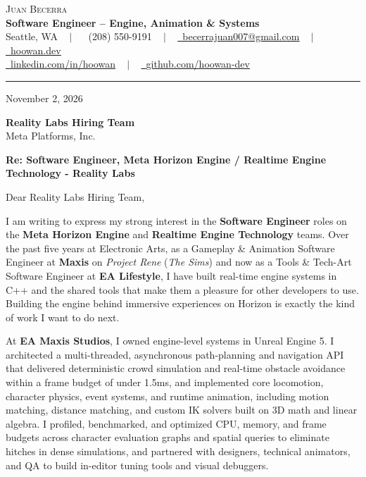 \documentclass[letterpaper,11pt]{article}
\begin{document}
\begin{center}
    {\Huge \scshape Juan Becerra} \\ \vspace{4pt}
    \textbf{\large Software Engineer -- Engine, Animation \& Systems} \\ \vspace{4pt}
    \small Seattle, WA ~ $|$ ~
    \raisebox{-0.1\height}\faPhone\ (208) 550-9191 ~ $|$ ~
    \href{mailto:becerrajuan007@gmail.com}{\raisebox{-0.2\height}\faEnvelope\ \underline{becerrajuan007@gmail.com}} ~ $|$ ~
    \href{https://hoowan.dev}{\raisebox{-0.2\height}\faGlobe\ \underline{hoowan.dev}} \\ \vspace{2pt}
    \href{https://linkedin.com/in/hoowan/}{\raisebox{-0.2\height}\faLinkedin\ \underline{linkedin.com/in/hoowan}} ~ $|$ ~
    \href{https://github.com/hoowan-dev}{\raisebox{-0.2\height}\faGithub\ \underline{github.com/hoowan-dev}}
\end{center}

\vspace{4pt}
\hrule
\vspace{14pt}

\noindent November 2, 2026

\vspace{8pt}
\noindent \textbf{Reality Labs Hiring Team} \\
Meta Platforms, Inc.

\vspace{8pt}
\noindent \textbf{Re: Software Engineer, Meta Horizon Engine / Realtime Engine Technology - Reality Labs}

\vspace{8pt}
\noindent Dear Reality Labs Hiring Team,

I am writing to express my strong interest in the \textbf{Software Engineer} roles on the \textbf{Meta Horizon
Engine} and \textbf{Realtime Engine Technology} teams. Over the past five years at Electronic Arts, as a Gameplay
\& Animation Software Engineer at \textbf{Maxis} on \emph{Project Rene} (\emph{The Sims}) and now as a Tools \&
Tech-Art Software Engineer at \textbf{EA Lifestyle}, I have built real-time engine systems in C++ and the shared
tools that make them a pleasure for other developers to use. Building the engine behind immersive experiences
on Horizon is exactly the kind of work I want to do next.

At \textbf{EA Maxis Studios}, I owned engine-level systems in Unreal Engine 5. I architected a multi-threaded,
asynchronous path-planning and navigation API that delivered deterministic crowd simulation and real-time
obstacle avoidance within a frame budget of under 1.5ms, and implemented core locomotion, character physics,
event systems, and runtime animation, including motion matching, distance matching, and custom IK solvers
built on 3D math and linear algebra. I profiled, benchmarked, and optimized CPU, memory, and frame budgets
across character evaluation graphs and spatial queries to eliminate hitches in dense simulations, and partnered
with designers, technical animators, and QA to build in-editor tuning tools and visual debuggers.
\end{document}
